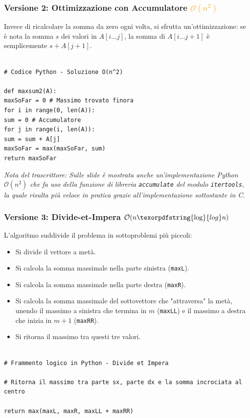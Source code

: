 \documentclass[12pt, a4paper]{article}
\begin{document}
\subsubsection{Versione 2: Ottimizzazione con Accumulatore \textcolor{orange}{$\mathcal{O}(n^2)$}}
Invece di ricalcolare la somma da zero ogni volta, si sfrutta un'ottimizzazione: se è nota la somma $s$ dei valori in $A[i...j]$, la somma di $A[i...j+1]$ è semplicemente $s + A[j+1]$.

\begin{verbatim}

# Codice Python - Soluzione O(n^2)

def maxsum2(A):
maxSoFar = 0 # Massimo trovato finora
for i in range(0, len(A)):
sum = 0 # Accumulatore
for j in range(i, len(A)):
sum = sum + A[j]
maxSoFar = max(maxSoFar, sum)
return maxSoFar
\end{verbatim}
\textit{Nota del trascrittore: Sulle slide è mostrata anche un'implementazione Python $\mathcal{O}(n^2)$ che fa uso della funzione di libreria \texttt{accumulate} del modulo \texttt{itertools}, la quale risulta più veloce in pratica grazie all'implementazione sottostante in C.}

\subsubsection{Versione 3: Divide-et-Impera \textcolor{cyan}{$\mathcal{O}(n \texorpdfstring{\log}{log} n)$}}
L'algoritmo suddivide il problema in sottoproblemi più piccoli:
\begin{itemize}
\item Si divide il vettore a metà.
\item Si calcola la somma massimale nella parte sinistra (\texttt{maxL}).
\item Si calcola la somma massimale nella parte destra (\texttt{maxR}).
\item Si calcola la somma massimale del sottovettore che "attraversa" la metà, unendo il massimo a sinistra che termina in $m$ (\texttt{maxLL}) e il massimo a destra che inizia in $m+1$ (\texttt{maxRR}).
\item Si ritorna il massimo tra questi tre valori.
\end{itemize}

\begin{verbatim}

# Frammento logico in Python - Divide et Impera

# Ritorna il massimo tra parte sx, parte dx e la somma incrociata al centro

return max(maxL, maxR, maxLL + maxRR)
\end{verbatim}
\end{document}
